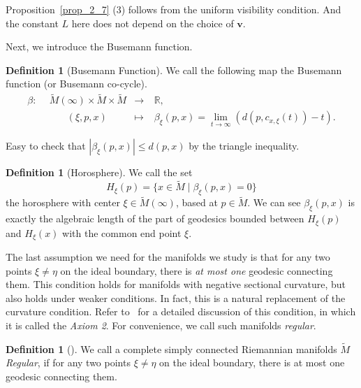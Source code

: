 \documentclass[reqno,11pt]{article}
\theoremstyle{definition}
\newtheorem{definition}[theorem]{Definition}
\theoremstyle{remark}
\numberwithin{equation}{section}
\begin{document}
Proposition~\ref{prop_2_7} (3) follows from the uniform visibility condition. And the constant $L$ here does not depend on the choice of $\bm{v}$.

Next, we introduce the Busemann function.

\begin{definition}[Busemann Function]
	We call the following map the Busemann function (or Busemann co-cycle).
	\begin{displaymath}
		\begin{aligned}
			\beta:~&~\widetilde{M}(\infty)\times\widetilde{M}\times\widetilde{M} & \to     &~\mathbb{R}                                               , \\
			        & \qquad(\xi,p,x)                                              & \mapsto &~\beta_{\xi}(p,x)=\lim_{t\to\infty}(d(p,c_{x,\xi}(t))-t).
		\end{aligned}
	\end{displaymath}
\end{definition}

Easy to check that $|\beta_{\xi}(p,x)|\leq d(p,x)$ by the triangle inequality.

\begin{definition}[Horosphere]
	We call the set
	\begin{displaymath}
		H_{\xi}(p)=\{x\in\widetilde{M}\mid\beta_{\xi}(p,x)=0\}
	\end{displaymath}
	the horosphere with center $\xi\in\widetilde{M}(\infty)$, based at $p\in\widetilde{M}$. We can see $\beta_{\xi}(p,x)$ is exactly
	the algebraic length of the part of geodesics bounded between $H_{\xi}(p)$ and $H_{\xi}(x)$ with the common end point $\xi$.
\end{definition}

The last assumption we need for the manifolds we study is that for any two points $\xi\neq\eta$ on the ideal boundary, there is \emph{at most one} geodesic connecting them. This condition holds for manifolds with negative sectional curvature, but also holds under weaker conditions. In fact, this is a natural replacement of the curvature condition. Refer to~\cite{Eb3} for a detailed discussion of this condition, in which it is called the \emph{Axiom 2}. For convenience, we call such manifolds \emph{regular}.

\begin{definition}[\cite{Eb1, Eb3}]
    We call a complete simply connected Riemannian manifolds $\widetilde{M}$ \emph{Regular}, if for any two points $\xi\neq\eta$ on the ideal boundary, there is at most one geodesic connecting them. 
\end{definition}
\end{document}
